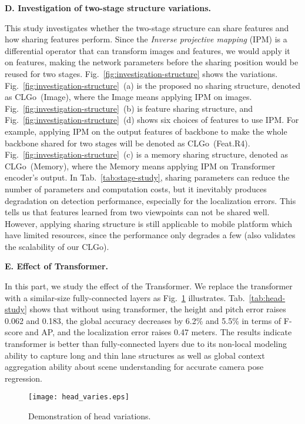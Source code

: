 \documentclass[letterpaper]{article} \usepackage{aaai22}  \usepackage{times}  \usepackage{helvet}  \usepackage{courier}  \usepackage[hyphens]{url}  \usepackage{graphicx} \urlstyle{rm} \def\UrlFont{\rm}  \usepackage{natbib}  \usepackage{caption}
\begin{document}
\noindent \textbf{D. Investigation of two-stage structure variations.}

This study investigates whether the two-stage structure can share features and how sharing features perform.  
Since the \textit{Inverse projective mapping} (IPM) is a differential operator that can transform images and features, we would apply it on features, making the network parameters before the sharing position would be reused for two stages.
Fig.~\ref{fig:investigation-structure} shows the variations.
Fig.~\ref{fig:investigation-structure}~(a) is the proposed no sharing structure, denoted as CLGo~(Image), where the Image means applying IPM on images.
Fig.~\ref{fig:investigation-structure}~(b) is feature sharing structure, and Fig.~\ref{fig:investigation-structure}~(d) shows six choices of features to use IPM. For example, applying IPM on the output features of backbone to make the whole backbone shared for two stages will be denoted as CLGo~(Feat.R4).
Fig.~\ref{fig:investigation-structure}~(c) is a memory sharing structure, denoted as CLGo~(Memory), where the Memory means applying IPM on Transformer encoder's output. In Tab.~\ref{tab:stage-study}, sharing parameters can reduce the number of parameters and computation costs, but it inevitably produces degradation on detection performance, especially for the localization errors.
This tells us that features learned from two viewpoints can not be shared well. However, applying sharing structure is still applicable to mobile platform which have limited resources, since the performance only degrades a few (also validates the scalability of our CLGo). 


\noindent \textbf{E. Effect of Transformer.}

In this part, we study the effect of the Transformer. We replace the transformer with a similar-size fully-connected layers as Fig.~\ref{fig:investigation-head} illustrates. Tab.~\ref{tab:head-study} shows that without using transformer, the height and pitch error raises 0.062 and 0.183, the global accuracy decreases by 6.2\% and 5.5\% in terms of F-score and AP, and the localization error raises 0.47 meters. The results indicate transformer is better than fully-connected layers due to its non-local modeling ability to capture long and thin lane structures as well as global context aggregation ability about scene understanding for accurate camera pose regression.

\begin{figure}[t]
\begin{center}
\texttt{[image: head\_varies.eps]}
\end{center}
\caption{{Demonstration of head variations}.}
\label{fig:investigation-head}
\end{figure}
\end{document}
